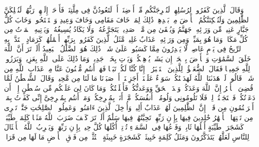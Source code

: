 \stopbuffer%
\startbuffer[\q:14:13]
وَقَالَ ٱلَّذِینَ كَفَرُوا۟ لِرُسُلِهِمۡ لَنُخۡرِجَنَّكُم مِّنۡ أَرۡضِنَاۤ أَوۡ لَتَعُودُنَّ فِی مِلَّتِنَاۖ فَأَوۡحَىٰۤ إِلَیۡهِمۡ رَبُّهُمۡ لَنُهۡلِكَنَّ ٱلظَّٰلِمِینَ%
\stopbuffer%
\startbuffer[\q:14:14]
وَلَنُسۡكِنَنَّكُمُ ٱلۡأَرۡضَ مِنۢ بَعۡدِهِمۡۚ ذَٰلِكَ لِمَنۡ خَافَ مَقَامِی وَخَافَ وَعِیدِ%
\stopbuffer%
\startbuffer[\q:14:15]
وَٱسۡتَفۡتَحُوا۟ وَخَابَ كُلُّ جَبَّارٍ عَنِیدࣲ%
\stopbuffer%
\startbuffer[\q:14:16]
مِّن وَرَاۤئِهِۦ جَهَنَّمُ وَیُسۡقَىٰ مِن مَّاۤءࣲ صَدِیدࣲ%
\stopbuffer%
\startbuffer[\q:14:17]
یَتَجَرَّعُهُۥ وَلَا یَكَادُ یُسِیغُهُۥ وَیَأۡتِیهِ ٱلۡمَوۡتُ مِن كُلِّ مَكَانࣲ وَمَا هُوَ بِمَیِّتࣲۖ وَمِن وَرَاۤئِهِۦ عَذَابٌ غَلِیظࣱ%
\stopbuffer%
\startbuffer[\q:14:18]
مَّثَلُ ٱلَّذِینَ كَفَرُوا۟ بِرَبِّهِمۡۖ أَعۡمَٰلُهُمۡ كَرَمَادٍ ٱشۡتَدَّتۡ بِهِ ٱلرِّیحُ فِی یَوۡمٍ عَاصِفࣲۖ لَّا یَقۡدِرُونَ مِمَّا كَسَبُوا۟ عَلَىٰ شَیۡءࣲۚ ذَٰلِكَ هُوَ ٱلضَّلَٰلُ ٱلۡبَعِیدُ%
\stopbuffer%
\startbuffer[\q:14:19]
أَلَمۡ تَرَ أَنَّ ٱللَّهَ خَلَقَ ٱلسَّمَٰوَٰتِ وَٱلۡأَرۡضَ بِٱلۡحَقِّۚ إِن یَشَأۡ یُذۡهِبۡكُمۡ وَیَأۡتِ بِخَلۡقࣲ جَدِیدࣲ%
\stopbuffer%
\startbuffer[\q:14:20]
وَمَا ذَٰلِكَ عَلَى ٱللَّهِ بِعَزِیزࣲ%
\stopbuffer%
\startbuffer[\q:14:21]
وَبَرَزُوا۟ لِلَّهِ جَمِیعࣰا فَقَالَ ٱلضُّعَفَٰۤؤُا۟ لِلَّذِینَ ٱسۡتَكۡبَرُوۤا۟ إِنَّا كُنَّا لَكُمۡ تَبَعࣰا فَهَلۡ أَنتُم مُّغۡنُونَ عَنَّا مِنۡ عَذَابِ ٱللَّهِ مِن شَیۡءࣲۚ قَالُوا۟ لَوۡ هَدَىٰنَا ٱللَّهُ لَهَدَیۡنَٰكُمۡۖ سَوَاۤءٌ عَلَیۡنَاۤ أَجَزِعۡنَاۤ أَمۡ صَبَرۡنَا مَا لَنَا مِن مَّحِیصࣲ%
\stopbuffer%
\startbuffer[\q:14:22]
وَقَالَ ٱلشَّیۡطَٰنُ لَمَّا قُضِیَ ٱلۡأَمۡرُ إِنَّ ٱللَّهَ وَعَدَكُمۡ وَعۡدَ ٱلۡحَقِّ وَوَعَدتُّكُمۡ فَأَخۡلَفۡتُكُمۡۖ وَمَا كَانَ لِیَ عَلَیۡكُم مِّن سُلۡطَٰنٍ إِلَّاۤ أَن دَعَوۡتُكُمۡ فَٱسۡتَجَبۡتُمۡ لِیۖ فَلَا تَلُومُونِی وَلُومُوۤا۟ أَنفُسَكُمۖ مَّاۤ أَنَا۠ بِمُصۡرِخِكُمۡ وَمَاۤ أَنتُم بِمُصۡرِخِیَّ إِنِّی كَفَرۡتُ بِمَاۤ أَشۡرَكۡتُمُونِ مِن قَبۡلُۗ إِنَّ ٱلظَّٰلِمِینَ لَهُمۡ عَذَابٌ أَلِیمࣱ%
\stopbuffer%
\startbuffer[\q:14:23]
وَأُدۡخِلَ ٱلَّذِینَ ءَامَنُوا۟ وَعَمِلُوا۟ ٱلصَّٰلِحَٰتِ جَنَّٰتࣲ تَجۡرِی مِن تَحۡتِهَا ٱلۡأَنۡهَٰرُ خَٰلِدِینَ فِیهَا بِإِذۡنِ رَبِّهِمۡۖ تَحِیَّتُهُمۡ فِیهَا سَلَٰمٌ%
\stopbuffer%
\startbuffer[\q:14:24]
أَلَمۡ تَرَ كَیۡفَ ضَرَبَ ٱللَّهُ مَثَلࣰا كَلِمَةࣰ طَیِّبَةࣰ كَشَجَرَةࣲ طَیِّبَةٍ أَصۡلُهَا ثَابِتࣱ وَفَرۡعُهَا فِی ٱلسَّمَاۤءِ%
\stopbuffer%
\startbuffer[\q:14:25]
تُؤۡتِیۤ أُكُلَهَا كُلَّ حِینِۭ بِإِذۡنِ رَبِّهَاۗ وَیَضۡرِبُ ٱللَّهُ ٱلۡأَمۡثَالَ لِلنَّاسِ لَعَلَّهُمۡ یَتَذَكَّرُونَ%
\stopbuffer%
\startbuffer[\q:14:26]
وَمَثَلُ كَلِمَةٍ خَبِیثَةࣲ كَشَجَرَةٍ خَبِیثَةٍ ٱجۡتُثَّتۡ مِن فَوۡقِ ٱلۡأَرۡضِ مَا لَهَا مِن قَرَارࣲ%
\stopbuffer%
